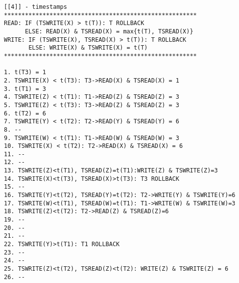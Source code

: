 \documentclass{article}
\begin{document}
\begin{verbatim}
[[4]] - timestamps
*******************************************************
READ: IF (TSWRITE(X) > t(T)): T ROLLBACK 
      ELSE: READ(X) & TSREAD(X) = max{t(T), TSREAD(X)}
WRITE: IF (TSWRITE(X), TSREAD(X) > t(T)): T ROLLBACK
       ELSE: WRITE(X) & TSWRITE(X) = t(T)
*******************************************************

1. t(T3) = 1
2. TSWRITE(X) < t(T3): T3->READ(X) & TSREAD(X) = 1
3. t(T1) = 3
4. TSWRITE(Z) < t(T1): T1->READ(Z) & TSREAD(Z) = 3
5. TSWRITE(Z) < t(T3): T3->READ(Z) & TSREAD(Z) = 3
6. t(T2) = 6
7. TSWRITE(Y) < t(T2): T2->READ(Y) & TSREAD(Y) = 6
8. --
9. TSWRITE(W) < t(T1): T1->READ(W) & TSREAD(W) = 3
10. TSWRITE(X) < t(T2): T2->READ(X) & TSREAD(X) = 6
11. --
12. --
13. TSWRITE(Z)<t(T1), TSREAD(Z)=t(T1):WRITE(Z) & TSWRITE(Z)=3
14. TSWRITE(X)<t(T3), TSREAD(X)>t(T3): T3 ROLLBACK
15. --
16. TSWRITE(Y)<t(T2), TSREAD(Y)=t(T2): T2->WRITE(Y) & TSWRITE(Y)=6
17. TSWRITE(W)<t(T1), TSREAD(W)=t(T1): T1->WRITE(W) & TSWRITE(W)=3
18. TSWRITE(Z)<t(T2): T2->READ(Z) & TSREAD(Z)=6
19. --
20. --
21. --
22. TSWRITE(Y)>t(T1): T1 ROLLBACK
23. --
24. --
25. TSWRITE(Z)<t(T2), TSREAD(Z)<t(T2): WRITE(Z) & TSWRITE(Z) = 6
26. --
\end{verbatim}




\end{document}
